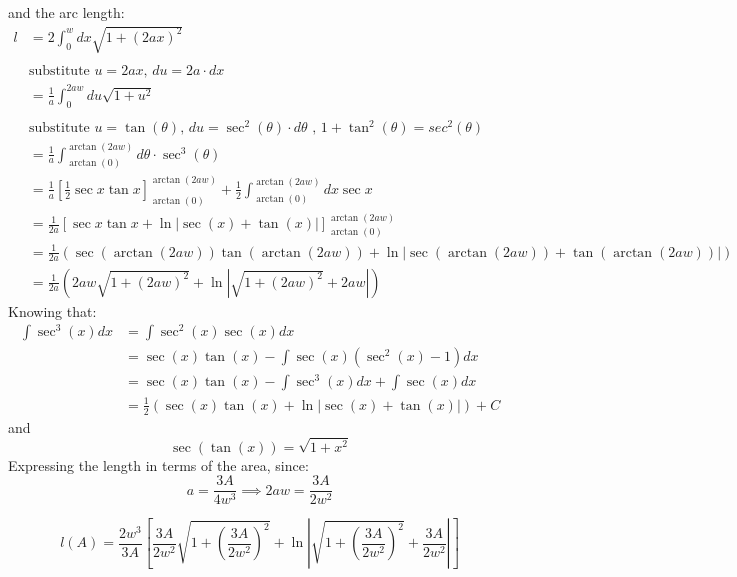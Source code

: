 \documentclass[12pt]{article}
\begin{document}
and the arc length:
\begin{equation}
    \begin{split}
        l&=2\int_0^wdx\sqrt{1 + (2ax)^2}
        \\
        \\ &\text{substitute }u=2ax\text{, }du=2a\cdot dx
        \\&=\frac{1}{a}\int_0^{2aw}du\sqrt{1 + u^2}
        \\
        \\ &\text{substitute }u=\tan(\theta)\text{, }du=\sec^2(\theta)\cdot d\theta\text{ , }1 + \tan^2(\theta) = sec^2(\theta)
        \\&=\frac{1}{a}\int_{\arctan(0)}^{\arctan{(2aw)}} d\theta \cdot \sec^3(\theta)
        \\&=\frac{1}{a}\left[\frac{1}{2}\sec{x}\tan{x}\right]_{\arctan(0)}^{\arctan(2aw)}+ \frac{1}{2}\int_{\arctan(0)}^{\arctan(2aw)} dx\sec{x}
        \\&= \frac{1}{2a}\left[\sec{x}\tan{x} + \ln{|\sec(x)+\tan(x)|}\right]_{\arctan(0)}^{\arctan(2aw)}
        \\&= \frac{1}{2a}(\sec(\arctan(2aw))\tan(\arctan(2aw)) + \ln{|\sec(\arctan(2aw))+\tan(\arctan(2aw))|})
        \\&=\frac{1}{2a}(2aw\sqrt{1 + (2aw)^2}+ \ln{|\sqrt{1 + (2aw)^2} + 2aw|})
    \end{split}
\end{equation}
Knowing that:
\begin{equation}
    \begin{split}
         \int \sec^3(x)dx &= \int \sec^2(x)\sec(x)dx
         \\&=\sec(x)\tan(x)-\int\sec(x)(\sec^2(x)-1)dx
         \\&=\sec(x)\tan(x)-\int\sec^3(x)dx+\int\sec(x)dx
         \\&=\frac{1}{2}\left(\sec(x)\tan(x)+\ln{|\sec(x)+\tan(x)|}\right) + C
    \end{split}
\end{equation}
and
\begin{equation}
    \sec(\tan(x)) = \sqrt{1+x^2}
\end{equation}
Expressing the length in terms of the area, since:
\begin{equation}
    a = \frac{3A}{4w^3} \implies 2aw = \frac{3A}{2w^2}
\end{equation}

\begin{equation}
    l(A) = \frac{2w^3}{3A}\left[\frac{3A}{2w^2}\sqrt{1 + \left(\frac{3A}{2w^2}\right)^2}+\ln\left|\sqrt{1 + \left(\frac{3A}{2w^2}\right)^2} + \frac{3A}{2w^2}\right|\right]
\end{equation}
\end{document}

